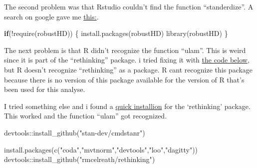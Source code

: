 \documentclass[
]{book}
\newenvironment{Shaded}{\begin{snugshade}}{\end{snugshade}}
\newcommand{\ControlFlowTok}[1]{\textcolor[rgb]{0.13,0.29,0.53}{\textbf{#1}}}
\newcommand{\FunctionTok}[1]{\textcolor[rgb]{0.00,0.00,0.00}{#1}}
\newcommand{\NormalTok}[1]{#1}
\newcommand{\SpecialCharTok}[1]{\textcolor[rgb]{0.00,0.00,0.00}{#1}}
\newcommand{\StringTok}[1]{\textcolor[rgb]{0.31,0.60,0.02}{#1}}
\begin{document}
The second problem was that Rstudio couldn't find the function ``standerdize''. A search on google gave me \href{https://app.datacamp.com/workspace/preview?_tag=rdocs\&rdocsPath=packages\%2FrobustHD\%2Fversions\%2F0.7.4\%2Ftopics\%2Fstandardize\&utm_source=r-docs\&utm_medium=docs\&utm_term=standardize\&utm_content=run_example_in_workspace}{this:}.

\begin{Shaded}
\begin{Highlighting}[]
\ControlFlowTok{if}\NormalTok{(}\SpecialCharTok{!}\FunctionTok{require}\NormalTok{(}\StringTok{\textquotesingle{}robustHD\textquotesingle{}}\NormalTok{)) \{}
  \FunctionTok{install.packages}\NormalTok{(}\StringTok{\textquotesingle{}robustHD\textquotesingle{}}\NormalTok{)}
  \FunctionTok{library}\NormalTok{(}\StringTok{\textquotesingle{}robustHD\textquotesingle{}}\NormalTok{)}
\NormalTok{\}}
\end{Highlighting}
\end{Shaded}

The next problem is that R didn't recognize the function ``ulam''. This is weird since it is part of the ``rethinking'' package. i tried fixing it with \href{https://app.datacamp.com/workspace/preview?_tag=rdocs\&rdocsPath=packages\%2Frethinking\%2Fversions\%2F2.13\%2Ftopics\%2Fulam\&utm_source=r-docs\&utm_medium=docs\&utm_term=ulam\&utm_content=run_example_in_workspace}{the code below}, but R doesn't recognize ``rethinking'' as a package. R cant recognize this package because there is no version of this package available for the version of R that's been used for this analyse.

I tried something else and i found a \href{https://www.rdocumentation.org/packages/rethinking/versions/2.13}{quick installion} for the `rethinking' package. This worked and the function ``ulam'' got recognized.

\begin{Shaded}
\begin{Highlighting}[]
\NormalTok{devtools}\SpecialCharTok{::}\FunctionTok{install\_github}\NormalTok{(}\StringTok{"stan{-}dev/cmdstanr"}\NormalTok{)}

\FunctionTok{install.packages}\NormalTok{(}\FunctionTok{c}\NormalTok{(}\StringTok{"coda"}\NormalTok{,}\StringTok{"mvtnorm"}\NormalTok{,}\StringTok{"devtools"}\NormalTok{,}\StringTok{"loo"}\NormalTok{,}\StringTok{"dagitty"}\NormalTok{))}
\NormalTok{devtools}\SpecialCharTok{::}\FunctionTok{install\_github}\NormalTok{(}\StringTok{"rmcelreath/rethinking"}\NormalTok{)}
\end{Highlighting}
\end{Shaded}
\end{document}
